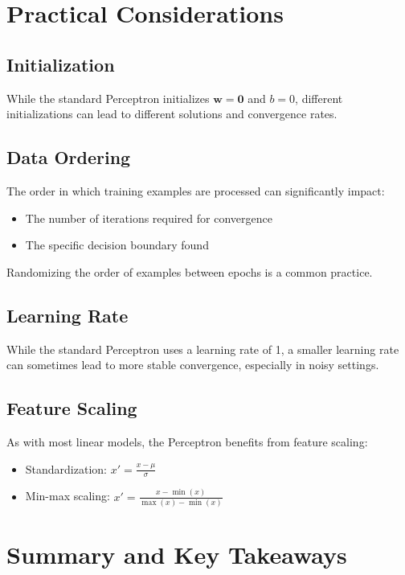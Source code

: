 \documentclass{article}
\begin{document}
\section{Practical Considerations}

\subsection{Initialization}
While the standard Perceptron initializes $\mathbf{w} = \mathbf{0}$ and $b = 0$, different initializations can lead to different solutions and convergence rates.

\subsection{Data Ordering}
The order in which training examples are processed can significantly impact:
\begin{itemize}
    \item The number of iterations required for convergence
    \item The specific decision boundary found
\end{itemize}
Randomizing the order of examples between epochs is a common practice.

\subsection{Learning Rate}
While the standard Perceptron uses a learning rate of 1, a smaller learning rate can sometimes lead to more stable convergence, especially in noisy settings.

\subsection{Feature Scaling}
As with most linear models, the Perceptron benefits from feature scaling:
\begin{itemize}
    \item Standardization: $x' = \frac{x - \mu}{\sigma}$
    \item Min-max scaling: $x' = \frac{x - \min(x)}{\max(x) - \min(x)}$
\end{itemize}

\section{Summary and Key Takeaways}
\end{document}
